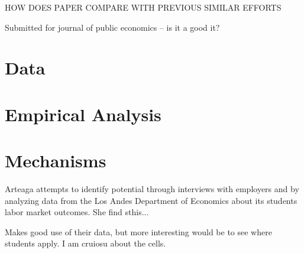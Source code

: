 \documentclass[a4paper, 11pt]{article}
\begin{document}
HOW DOES PAPER COMPARE WITH PREVIOUS SIMILAR EFFORTS

Submitted for journal of public economics -- is it a good it?



\section*{Data}
\section*{Empirical Analysis}
\section*{Mechanisms}

Arteaga attempts to identify potential through interviews with employers and by analyzing data from the Los Andes Department of Economics about its students labor market outcomes.  She find sthis...

Makes good use of their data, but more interesting would be to see where students apply.  I am cruiosu about the cells.  



% 
%
\end{document}
